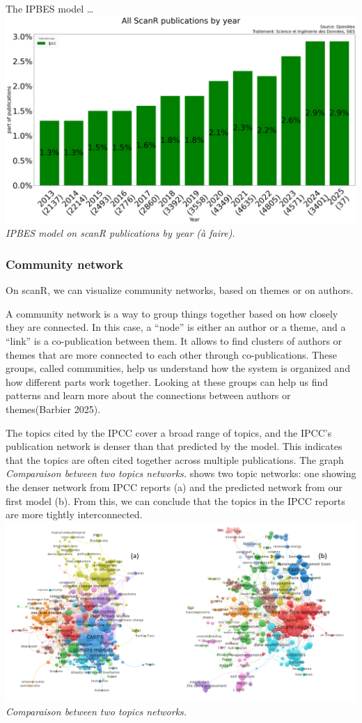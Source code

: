 \documentclass[
]{article}
\begin{document}
The IPBES model \ldots{}
\includegraphics{./images/teds_model_scanR1.png} \emph{IPBES model on
scanR publications by year (à faire).}

\hypertarget{community-network}{%
\subsubsection{Community network}\label{community-network}}

On scanR, we can visualize community networks, based on themes or on
authors.

A community network is a way to group things together based on how
closely they are connected. In this case, a ``node'' is either an author
or a theme, and a ``link'' is a co-publication between them. It allows
to find clusters of authors or themes that are more connected to each
other through co-publications. These groups, called communities, help us
understand how the system is organized and how different parts work
together. Looking at these groups can help us find patterns and learn
more about the connections between authors or themes(Barbier 2025).

The topics cited by the IPCC cover a broad range of topics, and the
IPCC's publication network is denser than that predicted by the model.
This indicates that the topics are often cited together across multiple
publications. The graph \emph{Comparaison between two topics networks.}
shows two topic networks: one showing the denser network from IPCC
reports (a) and the predicted network from our first model (b). From
this, we can conclude that the topics in the IPCC reports are more
tightly interconnected.
\includegraphics{./images/teds_network_topics2.png} \emph{Comparaison
between two topics networks.}
\end{document}
